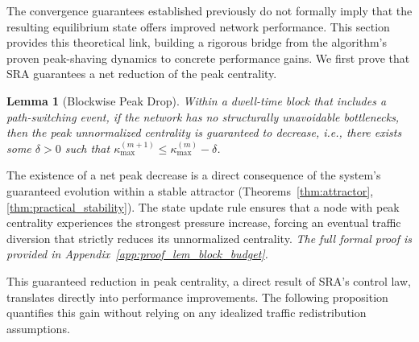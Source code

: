 \documentclass[journal]{IEEEtran}
\newtheorem{lemma}{Lemma}
\begin{document}
The convergence guarantees established previously do not formally imply that the resulting equilibrium state offers improved network performance. This section provides this theoretical link, building a rigorous bridge from the algorithm's proven peak-shaving dynamics to concrete performance gains. We first prove that SRA guarantees a net reduction of the peak centrality.

\begin{lemma}[Blockwise Peak Drop]
\label{lem:block-budget}
Within a dwell-time block that includes a path-switching event, if the network has no structurally unavoidable bottlenecks, then the peak unnormalized centrality is guaranteed to decrease, i.e., there exists some $\delta>0$ such that $\kappa^{(m+1)}_{\max}\le \kappa^{(m)}_{\max}-\delta$.
\end{lemma}
\begin{IEEEproof}
The existence of a net peak decrease is a direct consequence of the system's guaranteed evolution within a stable attractor (Theorems~\ref{thm:attractor}, \ref{thm:practical_stability}). The state update rule ensures that a node with peak centrality experiences the strongest pressure increase, forcing an eventual traffic diversion that strictly reduces its unnormalized centrality. \textit{The full formal proof is provided in Appendix~\ref{app:proof_lem_block_budget}.}
\end{IEEEproof}

This guaranteed reduction in peak centrality, a direct result of SRA's control law, translates directly into performance improvements. The following proposition quantifies this gain without relying on any idealized traffic redistribution assumptions.
\end{document}
